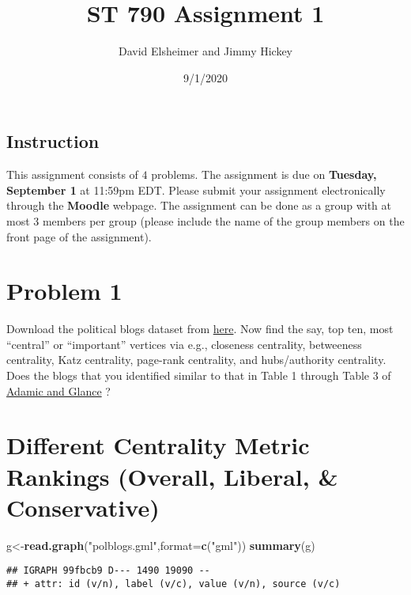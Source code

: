 \documentclass[
]{article}
\title{ST 790 Assignment 1}
\author{David Elsheimer and Jimmy Hickey}
\date{9/1/2020}
\newenvironment{Shaded}{\begin{snugshade}}{\end{snugshade}}
\newcommand{\DataTypeTok}[1]{\textcolor[rgb]{0.13,0.29,0.53}{#1}}
\newcommand{\KeywordTok}[1]{\textcolor[rgb]{0.13,0.29,0.53}{\textbf{#1}}}
\newcommand{\NormalTok}[1]{#1}
\newcommand{\StringTok}[1]{\textcolor[rgb]{0.31,0.60,0.02}{#1}}
\begin{document}
\maketitle

\hypertarget{instruction}{%
\subsection{Instruction}\label{instruction}}

This assignment consists of \(4\) problems. The assignment is due on
\textbf{Tuesday, September 1} at 11:59pm EDT. Please submit your
assignment electronically through the \textbf{Moodle} webpage. The
assignment can be done as a group with at most 3 members per group
(please include the name of the group members on the front page of the
assignment).

\hypertarget{problem-1}{%
\section{Problem 1}\label{problem-1}}

Download the political blogs dataset from
\href{http://www-personal.umich.edu/~mejn/netdata/}{here}. Now find the
say, top ten, most ``central'' or ``important'' vertices via e.g.,
closeness centrality, betweeness centrality, Katz centrality, page-rank
centrality, and hubs/authority centrality. Does the blogs that you
identified similar to that in Table 1 through Table 3 of
\href{http://www.ramb.ethz.ch/CDstore/www2005-ws/workshop/wf10/AdamicGlanceBlogWWW.pdf}{Adamic
and Glance} ?

\hypertarget{different-centrality-metric-rankings-overall-liberal-conservative}{%
\section{Different Centrality Metric Rankings (Overall, Liberal, \&
Conservative)}\label{different-centrality-metric-rankings-overall-liberal-conservative}}

\begin{Shaded}
\begin{Highlighting}[]
\NormalTok{g<-}\KeywordTok{read.graph}\NormalTok{(}\StringTok{"polblogs.gml"}\NormalTok{,}\DataTypeTok{format=}\KeywordTok{c}\NormalTok{(}\StringTok{"gml"}\NormalTok{))}
\KeywordTok{summary}\NormalTok{(g)}
\end{Highlighting}
\end{Shaded}

\begin{verbatim}
## IGRAPH 99fbcb9 D--- 1490 19090 -- 
## + attr: id (v/n), label (v/c), value (v/n), source (v/c)
\end{verbatim}
\end{document}
